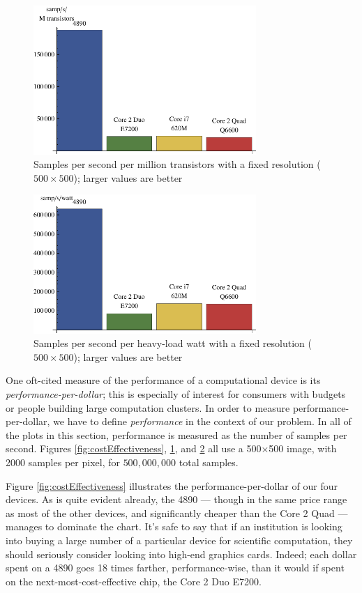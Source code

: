 \documentclass{acmsiggraph}
\begin{document}
\begin{figure}
    \includegraphics[width=84.5mm]{transistorPlot.pdf}
    \caption{Samples per second per million transistors with a fixed resolution ($500\times500$); larger values are better}
    \label{fig:transistorPlot}
\end{figure}

\begin{figure}
    \includegraphics[width=84.5mm]{wattPlot.pdf}
    \caption{Samples per second per heavy-load watt with a fixed resolution ($500\times500$); larger values are better}
    \label{fig:wattPlot}
\end{figure}

One oft-cited measure of the performance of a computational device is its {\it performance-per-dollar}; this is especially of interest for consumers with budgets or people building large computation clusters. In order to measure performance-per-dollar, we have to define {\it performance} in the context of our problem. In all of the plots in this section, performance is measured as the number of samples per second. Figures \ref{fig:costEffectiveness}, \ref{fig:transistorPlot}, and \ref{fig:wattPlot} all use a 500$\times$500 image, with 2000 samples per pixel, for $500,000,000$ total samples.

Figure \ref{fig:costEffectiveness} illustrates the performance-per-dollar of our four devices. As is quite evident already, the 4890 --- though in the same price range as most of the other devices, and significantly cheaper than the Core 2 Quad --- manages to dominate the chart. It's safe to say that if an institution is looking into buying a large number of a particular device for scientific computation, they should seriously consider looking into high-end graphics cards. Indeed; each dollar spent on a 4890 goes 18 times farther, performance-wise, than it would if spent on the next-most-cost-effective chip, the Core 2 Duo E7200.
\end{document}
